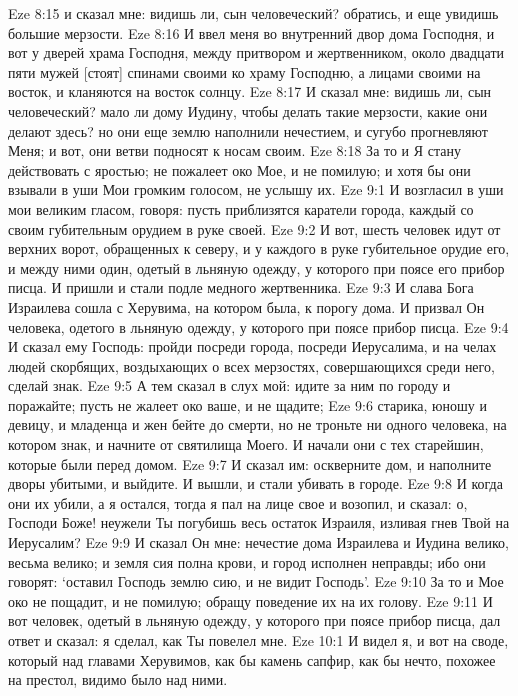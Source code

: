 Eze 8:15  и сказал мне: видишь ли, сын человеческий? обратись, и еще увидишь большие мерзости.
Eze 8:16  И ввел меня во внутренний двор дома Господня, и вот у дверей храма Господня, между притвором и жертвенником, около двадцати пяти мужей [стоят] спинами своими ко храму Господню, а лицами своими на восток, и кланяются на восток солнцу.
Eze 8:17  И сказал мне: видишь ли, сын человеческий? мало ли дому Иудину, чтобы делать такие мерзости, какие они делают здесь? но они еще землю наполнили нечестием, и сугубо прогневляют Меня; и вот, они ветви подносят к носам своим.
Eze 8:18  За то и Я стану действовать с яростью; не пожалеет око Мое, и не помилую; и хотя бы они взывали в уши Мои громким голосом, не услышу их.
Eze 9:1  И возгласил в уши мои великим гласом, говоря: пусть приблизятся каратели города, каждый со своим губительным орудием в руке своей.
Eze 9:2  И вот, шесть человек идут от верхних ворот, обращенных к северу, и у каждого в руке губительное орудие его, и между ними один, одетый в льняную одежду, у которого при поясе его прибор писца. И пришли и стали подле медного жертвенника.
Eze 9:3  И слава Бога Израилева сошла с Херувима, на котором была, к порогу дома. И призвал Он человека, одетого в льняную одежду, у которого при поясе прибор писца.
Eze 9:4  И сказал ему Господь: пройди посреди города, посреди Иерусалима, и на челах людей скорбящих, воздыхающих о всех мерзостях, совершающихся среди него, сделай знак.
Eze 9:5  А тем сказал в слух мой: идите за ним по городу и поражайте; пусть не жалеет око ваше, и не щадите;
Eze 9:6  старика, юношу и девицу, и младенца и жен бейте до смерти, но не троньте ни одного человека, на котором знак, и начните от святилища Моего. И начали они с тех старейшин, которые были перед домом.
Eze 9:7  И сказал им: оскверните дом, и наполните дворы убитыми, и выйдите. И вышли, и стали убивать в городе.
Eze 9:8  И когда они их убили, а я остался, тогда я пал на лице свое и возопил, и сказал: о, Господи Боже! неужели Ты погубишь весь остаток Израиля, изливая гнев Твой на Иерусалим?
Eze 9:9  И сказал Он мне: нечестие дома Израилева и Иудина велико, весьма велико; и земля сия полна крови, и город исполнен неправды; ибо они говорят: `оставил Господь землю сию, и не видит Господь'.
Eze 9:10  За то и Мое око не пощадит, и не помилую; обращу поведение их на их голову.
Eze 9:11  И вот человек, одетый в льняную одежду, у которого при поясе прибор писца, дал ответ и сказал: я сделал, как Ты повелел мне.
Eze 10:1  И видел я, и вот на своде, который над главами Херувимов, как бы камень сапфир, как бы нечто, похожее на престол, видимо было над ними.
